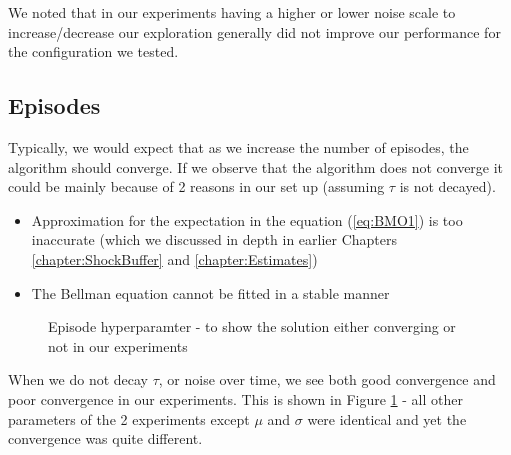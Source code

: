 We noted that in our experiments having a higher or lower noise scale to increase/decrease our exploration generally did not improve our performance for the configuration we tested.
\pagebreak

\subsection{Episodes}
Typically, we would expect that as we increase the number of episodes, the algorithm should converge. If we observe that the algorithm does not converge it could be mainly because of 2 reasons in our set up (assuming $\tau$ is not decayed).
\begin{itemize}
    \item Approximation for the expectation in the equation (\ref{eq:BMO1}) is too inaccurate (which we discussed in depth in earlier Chapters \ref{chapter:ShockBuffer} and \ref{chapter:Estimates})
    \item The Bellman equation cannot be fitted in a stable manner 
\end{itemize}
\begin{figure}[!tbp]
  \vfill
  
  \caption{ Episode hyperparamter - to show the solution either converging  or not in our experiments}
  \label{fig:episdode_analysis}
\end{figure}
\pagebreak
When we do not decay $\tau$, or noise over time, we see both good convergence and poor convergence in our experiments. This is shown in Figure \ref{fig:episdode_analysis} - all other parameters of the 2 experiments except $\mu$ and $\sigma$ were identical and yet the convergence was quite different.

